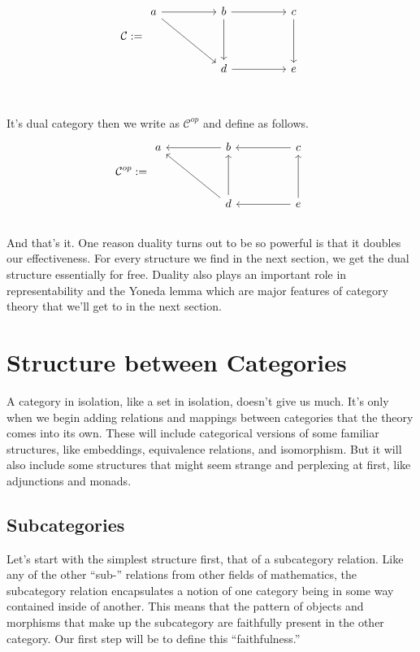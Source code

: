 \documentclass[12pt]{article}
\theoremstyle{definition}
\begin{document}
\[\mathcal{C} := \begin{tikzcd}
        a && b && c \\
        \\
        && d && e
        \arrow[from=1-1, to=1-3]
        \arrow[from=1-1, to=3-3]
        \arrow[from=1-3, to=3-3]
        \arrow[from=3-3, to=3-5]
        \arrow[from=1-3, to=1-5]
        \arrow[from=1-5, to=3-5]
    \end{tikzcd}\]
\\\\It's dual category then we write as $\mathcal{C}^{op}$ and define as follows.
\[\mathcal{C}^{op} := \begin{tikzcd}
        a && b && c \\
        \\
        && d && e
        \arrow[from=1-3, to=1-1]
        \arrow[from=3-3, to=1-1]
        \arrow[from=3-3, to=1-3]
        \arrow[from=3-5, to=3-3]
        \arrow[from=1-5, to=1-3]
        \arrow[from=3-5, to=1-5]
    \end{tikzcd}\]
\\
And that's it.
One reason duality turns out to be so powerful is that it doubles our effectiveness.
For every structure we find in the next section, we get the dual structure essentially for free.
Duality also plays an important role in representability and the Yoneda lemma which are major features of category theory that we'll get to in the next section.







\pagebreak

\section*{Structure between Categories}
A category in isolation, like a set in isolation, doesn't give us much.
It's only when we begin adding relations and mappings between categories that the theory comes into its own.
These will include categorical versions of some familiar structures, like embeddings, equivalence relations, and isomorphism.
But it will also include some structures that might seem strange and perplexing at first, like adjunctions and monads.


\subsection*{Subcategories}
Let's start with the simplest structure first, that of a subcategory relation.
Like any of the other ``sub-'' relations from other fields of mathematics, the subcategory relation encapsulates a notion of one category being in some way contained inside of another.
This means that the pattern of objects and morphisms that make up the subcategory are faithfully present in the other category.
Our first step will be to define this ``faithfulness.''
\end{document}
